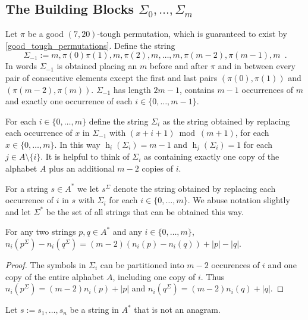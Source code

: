 \documentclass[kpfonts]{patmorin}
\DeclareMathOperator{\hist}{h}
\begin{document}
\subsection{The Building Blocks $\Sigma_0,\ldots,\Sigma_m$}
Let $\pi$ be a good $(7,20)$-tough permutation, which is guaranteed to exist by \cref{good_tough_permutations}.
Define the string
\[
    \Sigma_{-1} := m,\pi(0)\pi(1),m,\pi(2),m,\ldots,m,\pi(m-2),\pi(m-1),m \enspace .
\]
In words $\Sigma_{-1}$ is obtained placing an $m$ before and after $\pi$ and in between every pair of consecutive elements except the first and last pairs $(\pi(0),\pi(1))$ and $(\pi(m-2),\pi(m))$.  $\Sigma_{-1}$ has length $2m-1$, contains $m-1$ occurrences of $m$ and exactly one occurrence of each $i\in\{0,\ldots,m-1\}$.

For each $i\in\{0,\ldots,m\}$ define the string $\Sigma_i$ as the string obtained by replacing each occurrence of $x$ in $\Sigma_{-1}$ with $(x+i+1)\bmod (m+1)$, for each $x\in\{0,\ldots,m\}$.  In this way $\hist_i(\Sigma_i) = m-1$ and $\hist_j(\Sigma_i)=1$ for each $j\in A\setminus\{i\}$. It is helpful to think of $\Sigma_i$ as containing exactly one copy of the alphabet $A$ plus an additional $m-2$ copies of $i$.


For a string $s\in A^*$ we let $s^\Sigma$ denote the string obtained by replacing each occurrence of $i$ in $s$ with $\Sigma_i$ for each $i\in\{0,\ldots,m\}$. We abuse notation slightly and let $\Sigma^*$ be the set of all strings that can be obtained this way.

\begin{lem}
    For any two strings $p,q\in A^*$ and any $i\in\{0,\ldots,m\}$, $n_i(p^\Sigma)-n_i(q^\Sigma) = (m-2)(n_i(p)-n_i(q)) + |p|-|q|$.
\end{lem}

\begin{proof}
    The symbols in $\Sigma_i$ can be partitioned into $m-2$ occurences of $i$ and one copy of the entire alphabet $A$, including one copy of $i$.  Thus $n_i(p^\Sigma)=(m-2)n_i(p)+|p|$ and $n_i(q^\Sigma)=(m-2)n_i(q)+|q|$.
\end{proof}


\begin{lem}
    Let $s:=s_1,\ldots,s_n$ be a string in $A^*$ that is not an anagram.
\end{lem}
\end{document}
